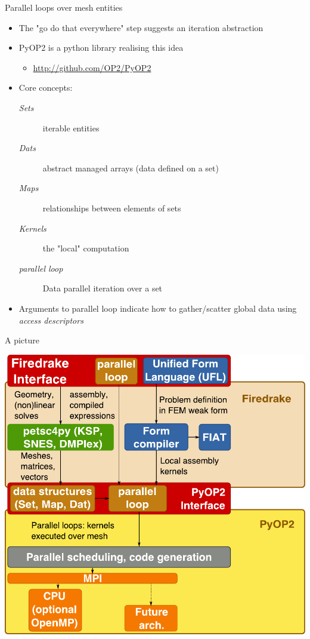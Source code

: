 \documentclass[presentation]{beamer}
\begin{document}
\begin{frame}[label=sec-3-6]{Parallel loops over mesh entities}
\begin{itemize}
\item The "go do that everywhere" step suggests an iteration abstraction
\item PyOP2 is a python library realising this idea
\begin{itemize}
\item \url{http://github.com/OP2/PyOP2}
\end{itemize}
\item Core concepts:
\begin{description}
\item[{\emph{Sets}}] iterable entities
\item[{\emph{Dats}}] abstract managed arrays (data defined on a set)
\item[{\emph{Maps}}] relationships between elements of sets
\item[{\emph{Kernels}}] the "local" computation
\item[{\emph{parallel loop}}] Data parallel iteration over a set
\end{description}
\item Arguments to parallel loop indicate how to gather/scatter global
data using \emph{access descriptors}
\end{itemize}
\end{frame}

\begin{frame}[label=sec-3-7]{A picture}
\begin{center}
\includegraphics[height=0.9\textheight]{06-10-Imperial-RA-symposium-firedrake.figures/toolchain}
\end{center}
\end{frame}
\end{document}

